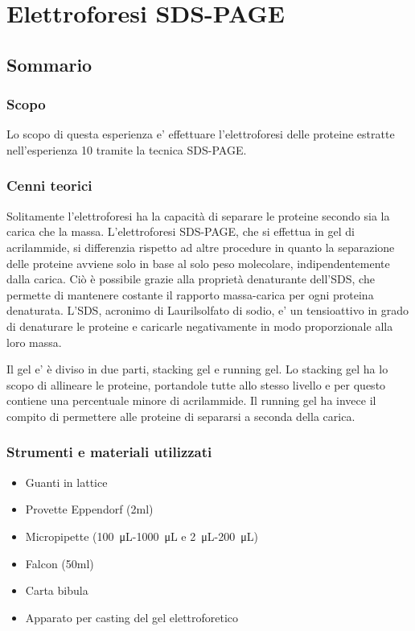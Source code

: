 \section{\LARGE{Elettroforesi SDS-PAGE }}

\vspace{0.6cm}


\subsection{Sommario}

\subsubsection{Scopo}

Lo scopo di questa esperienza e' effettuare l'elettroforesi
delle proteine estratte nell'esperienza 10 tramite la
tecnica SDS-PAGE.

\subsubsection{Cenni teorici}

Solitamente l'elettroforesi ha la capacit\`a di separare le proteine secondo sia
la carica che la massa.
L'elettroforesi SDS-PAGE, che si effettua in gel di acrilammide, si differenzia
rispetto ad altre procedure in quanto la separazione delle proteine
avviene solo in base al solo peso molecolare, indipendentemente dalla carica.
Ci\`o \`e possibile grazie alla propriet\`a denaturante dell'SDS,
che permette di mantenere costante il rapporto massa-carica per ogni proteina denaturata.
L'SDS, acronimo di Laurilsolfato di sodio, e' un tensioattivo in grado di denaturare le proteine e
caricarle negativamente in modo proporzionale alla loro massa.

Il gel e' \`e diviso in due parti, stacking gel e running gel. Lo stacking gel
ha lo scopo di allineare le proteine, portandole tutte allo stesso livello e per
questo contiene una percentuale minore di acrilammide.
Il running gel ha invece il compito di permettere alle proteine di separarsi a
seconda della carica.

\subsubsection{Strumenti e materiali utilizzati}

\begin{itemize}
\item Guanti in lattice
\item Provette Eppendorf (2ml)
\item Micropipette (\SI{100}{\micro\liter}-\SI{1000}{\micro\liter} e \SI{2}{\micro\liter}-\SI{200}{\micro\liter})
\item Falcon (50ml)
\item Carta bibula
\item Apparato per casting del gel elettroforetico
\end{itemize}

